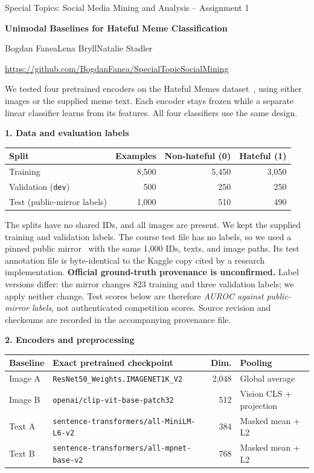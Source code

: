\documentclass[10pt,a4paper]{article}
\newcommand{\sect}[1]{\vspace{5pt}\textbf{#1}\par\vspace{1pt}}
\newcommand{\model}[1]{\texttt{#1}}
\begin{document}
\begin{center}
{\small Special Topics: Social Media Mining and Analysis -- Assignment 1}\par
\vspace{3pt}
{\Large\bfseries Unimodal Baselines for Hateful Meme Classification}\par
\vspace{5pt}
Bogdan Fanea\qquad Lena Bryll\qquad Natalie Stadler\par
\vspace{2pt}
{\small\url{https://github.com/BogdanFanea/SpecialTopicSocialMining}}
\end{center}
\vspace{-3pt}

We tested four pretrained encoders on the Hateful Memes dataset~\cite{kiela}, using
either images or the supplied meme text. Each encoder stays frozen while a separate
linear classifier learns from its features. All four classifiers use the same design.

\sect{1. Data and evaluation labels}
\begin{tabularx}{\linewidth}{@{}Yrrr@{}}
\toprule
Split & Examples & Non-hateful (0) & Hateful (1)\\
\midrule
Training & 8,500 & 5,450 & 3,050\\
Validation (\model{dev}) & 500 & 250 & 250\\
Test (public-mirror labels) & 1,000 & 510 & 490\\
\bottomrule
\end{tabularx}

The splits have no shared IDs, and all images are present. We kept the supplied
training and validation labels. The course test file has no labels, so we used a pinned
public mirror~\cite{labels} with the same 1,000 IDs, texts, and image paths. Its test
annotation file is byte-identical to the Kaggle copy cited by a research implementation.
\textbf{Official ground-truth provenance is unconfirmed.} Label versions differ:
the mirror changes 823 training and three validation labels; we apply neither
change. Test scores below are therefore \emph{AUROC against public-mirror labels},
not authenticated competition scores. Source revision and checksums are recorded
in the accompanying provenance file.

\sect{2. Encoders and preprocessing}
\begin{tabularx}{\linewidth}{@{}lYr l@{}}
\toprule
Baseline & Exact pretrained checkpoint & Dim. & Pooling\\
\midrule
Image A & \model{ResNet50\_Weights.IMAGENET1K\_V2} & 2,048 & Global average\\
Image B & \model{openai/clip-vit-base-patch32} & 512 & Vision CLS + projection\\
Text A & \model{sentence-transformers/all-MiniLM-L6-v2} & 384 & Masked mean + L2\\
Text B & \model{sentence-transformers/all-mpnet-base-v2} & 768 & Masked mean + L2\\
\bottomrule
\end{tabularx}
\end{document}
